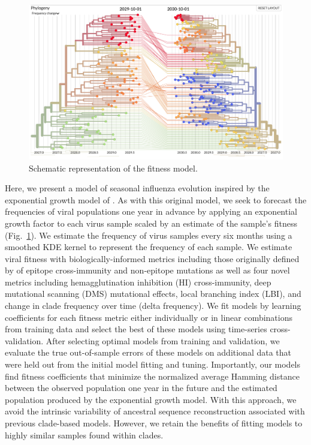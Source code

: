 \begin{figure}[t]
  \begin{center}
  \includegraphics[width=\textwidth]{figures/model.png}
  \caption{Schematic representation of the fitness model.}
  \label{fig:model}
  \end{center}
\end{figure}

Here, we present a model of seasonal influenza evolution inspired by the exponential growth model of \cite{Luksza:2014hj}.
As with this original model, we seek to forecast the frequencies of viral populations one year in advance by applying an exponential growth factor to each virus sample scaled by an estimate of the sample's fitness (Fig.~\ref{fig:model}).
We estimate the frequency of virus samples every six months using a smoothed KDE kernel to represent the frequency of each sample.
We estimate viral fitness with biologically-informed metrics including those originally defined by \cite{Luksza:2014hj} of epitope cross-immunity and non-epitope mutations as well as four novel metrics including hemagglutination inhibition (HI) cross-immunity, deep mutational scanning (DMS) mutational effects, local branching index (LBI), and change in clade frequency over time (delta frequency).
We fit models by learning coefficients for each fitness metric either individually or in linear combinations from training data and select the best of these models using time-series cross-validation.
After selecting optimal models from training and validation, we evaluate the true out-of-sample errors of these models on additional data that were held out from the initial model fitting and tuning.
Importantly, our models find fitness coefficients that minimize the normalized average Hamming distance between the observed population one year in the future and the estimated population produced by the exponential growth model.
With this approach, we avoid the intrinsic variability of ancestral sequence reconstruction associated with previous clade-based models.
However, we retain the benefits of fitting models to highly similar samples found within clades.

